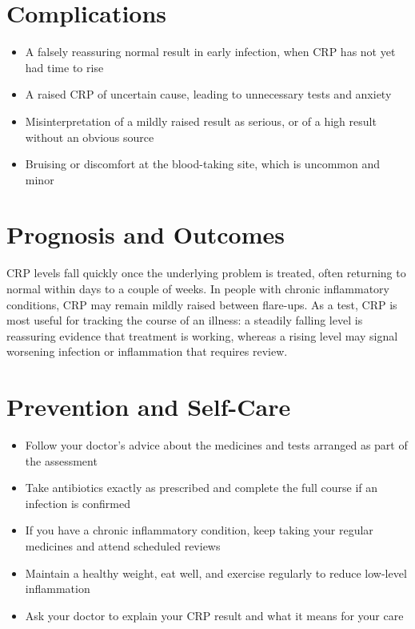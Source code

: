 \section*{Complications}
\begin{itemize}
    \item A falsely reassuring normal result in early infection, when CRP has not yet had time to rise
    \item A raised CRP of uncertain cause, leading to unnecessary tests and anxiety
    \item Misinterpretation of a mildly raised result as serious, or of a high result without an obvious source
    \item Bruising or discomfort at the blood-taking site, which is uncommon and minor
\end{itemize}

\section*{Prognosis and Outcomes}
CRP levels fall quickly once the underlying problem is treated, often returning to normal within days to a couple of weeks. In people with chronic inflammatory conditions, CRP may remain mildly raised between flare-ups. As a test, CRP is most useful for tracking the course of an illness: a steadily falling level is reassuring evidence that treatment is working, whereas a rising level may signal worsening infection or inflammation that requires review.

\section*{Prevention and Self-Care}
\begin{itemize}
    \item Follow your doctor's advice about the medicines and tests arranged as part of the assessment
    \item Take antibiotics exactly as prescribed and complete the full course if an infection is confirmed
    \item If you have a chronic inflammatory condition, keep taking your regular medicines and attend scheduled reviews
    \item Maintain a healthy weight, eat well, and exercise regularly to reduce low-level inflammation
    \item Ask your doctor to explain your CRP result and what it means for your care
\end{itemize}


